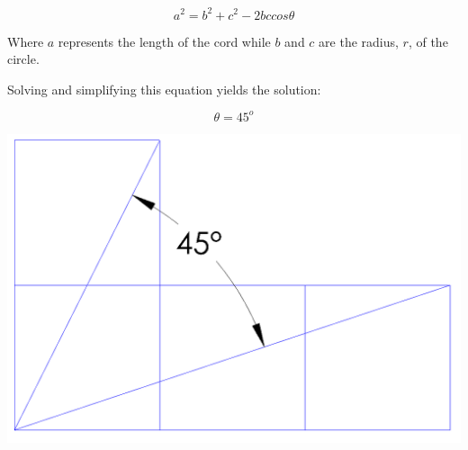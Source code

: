 \documentclass{article}
\begin{document}
$$ a^2=b^2+c^2-2bccos\theta$$

Where $a$ represents the length of the cord while $b$ and $c$ are the radius, $r$, of the circle. 


Solving and simplifying this equation yields the solution:
 \begin{center}
$$\theta=45^o$$

\includegraphics[width=.8\linewidth]{solution.png}
 \end{center}
\end{document}
